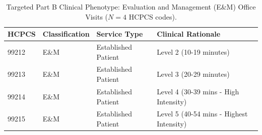 \begin{table}[htbp]
\caption{Targeted Part B Clinical Phenotype: Evaluation and Management (E\&M) Office Visits ($N=4$ HCPCS codes).}
\label{tab:em_codes}
\begin{tabular}{llp{3cm}p{4cm}}
\toprule
\rowcolor{gray!10}
HCPCS & Classification & Service Type & Clinical Rationale \\
\midrule
99212 & E\&M & Established Patient & Level 2 (10-19 minutes) \\
99213 & E\&M & Established Patient & Level 3 (20-29 minutes) \\
99214 & E\&M & Established Patient & Level 4 (30-39 mins - High Intensity) \\
99215 & E\&M & Established Patient & Level 5 (40-54 mins - Highest Intensity) \\
\bottomrule
\end{tabular}
\end{table}
